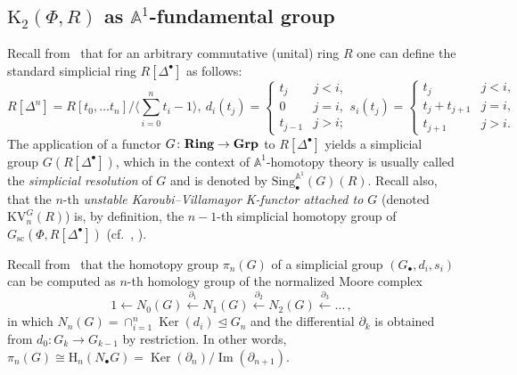 \documentclass[oneside, 11pt]{amsart} \pdfoutput=1
\renewcommand{\Im}{\mathop{\mathrm{Im}}\nolimits}
\newcommand{\Ker}{\mathop{\mathrm{Ker}}\nolimits}
\newcommand{\K}{{\mathrm{K}}}
\numberwithin{equation}{section}
\theoremstyle{definition}
\newcommand{\catname}[1]{{\normalfont\textbf{#1}}} %
\begin{document}
\subsection{\texorpdfstring{$\K_2(\Phi, R)$}{K2(R)} as $\mathbb{A}^1$-fundamental group}
Recall from~\cite{Jar83} that for an arbitrary commutative (unital) ring $R$ one can define the standard simplicial ring $R[\Delta^\bullet]$ as follows:
\begin{equation}
 R[\Delta^n] = R[t_0,\ldots t_n]/\langle \sum_{i=0}^n t_i -1 \rangle,\ d_i(t_j) = \left\{ \begin{array}{ll}t_j & j < i, \\0 & j = i, \\ t_{j-1} & j > i; \end{array}\right. s_i(t_j) = \left\{ \begin{array}{ll} t_j & j < i, \\ t_j + t_{j+1} & j = i, \\ t_{j+1} & j > i. \end{array} \right.
\end{equation}
	The application of a functor $G\colon\catname{Ring}\rightarrow\catname{Grp}$ to $R[\Delta^\bullet]$ yields a simplicial group $G(R[\Delta^\bullet])$, which in the context of $\mathbb{A}^1$-homotopy theory is usually called the {\it simplicial resolution} of $G$ and is denoted by $\mathrm{Sing}^{\mathbb{A}^1}_\bullet(G)(R)$. Recall also, that the $n$-th {\it unstable Karoubi--Villamayor K-functor attached to $G$} (denoted $\mathrm{KV}^G_n(R)$) is, by definition, the $n-1$-th simplicial homotopy group of $G_\mathrm{sc}(\Phi, R[\Delta^\bullet])$ (cf.~\cite[\S~4.3]{AHW18}, \cite[\S~3]{Jar83}).

Recall from~\cite[\S~17]{May67} that the homotopy group $\pi_n(G)$ of a simplicial group $(G_\bullet, d_i, s_i)$ can be computed as $n$-th homology group of the normalized Moore complex
\[ 1 \leftarrow N_0(G) \xleftarrow{\partial_1} N_1(G) \xleftarrow{\partial_2} N_2(G) \xleftarrow{\partial_3} \ldots\,, \]
in which $N_n(G) = \cap_{i=1}^n\Ker(d_i) \trianglelefteq G_n$ and the differential $\partial_k$ is obtained from $d_0\colon G_k \to G_{k-1}$ by restriction. In other words, $\pi_n(G) \cong \mathrm{H}_n(N_\bullet G) = \Ker(\partial_n) / \Im(\partial_{n+1})$.
\end{document}
